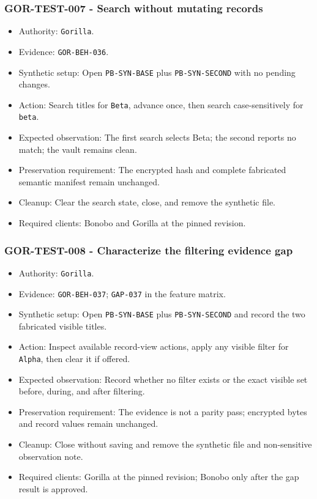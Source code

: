 \documentclass[
  letterpaper,
]{article}
\newcommand{\passthrough}[1]{#1}
\providecommand{\tightlist}{%
  \setlength{\itemsep}{0pt}\setlength{\parskip}{0pt}}
\begin{document}
\subsubsection{GOR-TEST-007 - Search without mutating records}\label{gor-test-007---search-without-mutating-records}

\begin{itemize}
\tightlist
\item
  Authority: \passthrough{\lstinline!Gorilla!}.
\item
  Evidence: \nolinkurl{GOR-BEH-036}.
\item
  Synthetic setup: Open \nolinkurl{PB-SYN-BASE} plus \nolinkurl{PB-SYN-SECOND} with no pending changes.
\item
  Action: Search titles for \passthrough{\lstinline!Beta!}, advance once, then search case-sensitively for
  \passthrough{\lstinline!beta!}.
\item
  Expected observation: The first search selects Beta; the second reports no match; the vault remains clean.
\item
  Preservation requirement: The encrypted hash and complete fabricated semantic manifest remain unchanged.
\item
  Cleanup: Clear the search state, close, and remove the synthetic file.
\item
  Required clients: Bonobo and Gorilla at the pinned revision.
\end{itemize}

\subsubsection{GOR-TEST-008 - Characterize the filtering evidence
gap}\label{gor-test-008---characterize-the-filtering-evidence-gap}

\begin{itemize}
\tightlist
\item
  Authority: \passthrough{\lstinline!Gorilla!}.
\item
  Evidence: \nolinkurl{GOR-BEH-037}; \passthrough{\lstinline!GAP-037!} in the feature matrix.
\item
  Synthetic setup: Open \nolinkurl{PB-SYN-BASE} plus \nolinkurl{PB-SYN-SECOND} and record the two fabricated visible
  titles.
\item
  Action: Inspect available record-view actions, apply any visible filter for \passthrough{\lstinline!Alpha!}, then
  clear it if offered.
\item
  Expected observation: Record whether no filter exists or the exact visible set before, during, and after filtering.
\item
  Preservation requirement: The evidence is not a parity pass; encrypted bytes and record values remain unchanged.
\item
  Cleanup: Close without saving and remove the synthetic file and non-sensitive observation note.
\item
  Required clients: Gorilla at the pinned revision; Bonobo only after the gap result is approved.
\end{itemize}
\end{document}
